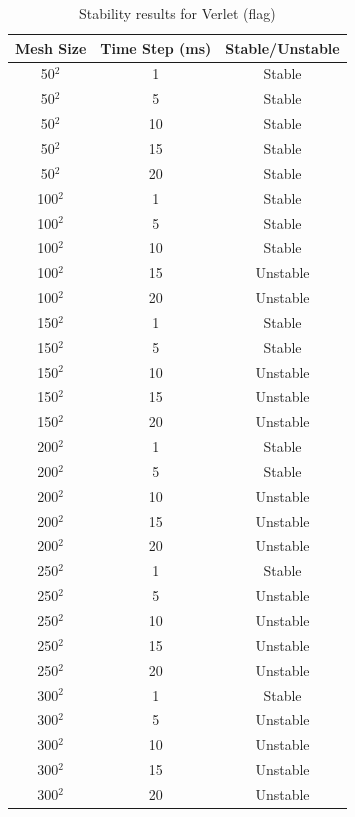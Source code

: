 \begin{table}[tp]
   \begin{minipage}{\textwidth}
      \begin{center}
         \begin{tabular}{|c|c|c|} \hline
           Mesh Size & Time Step (ms) & Stable/Unstable\\
           \hline
           50$^{2}$ & 1 & Stable\\ \hline
           50$^{2}$ & 5 & Stable\\ \hline
           50$^{2}$ & 10 & Stable\\ \hline
           50$^{2}$ & 15 & Stable\\ \hline
           50$^{2}$ & 20 & Stable\\ \hline
           100$^{2}$ & 1 & Stable\\ \hline
           100$^{2}$ & 5 & Stable\\ \hline
           100$^{2}$ & 10 & Stable\\ \hline
           100$^{2}$ & 15 & Unstable\\ \hline
           100$^{2}$ & 20 & Unstable\\ \hline           
           150$^{2}$ & 1 & Stable\\ \hline
           150$^{2}$ & 5 & Stable\\ \hline
           150$^{2}$ & 10 & Unstable\\ \hline
           150$^{2}$ & 15 & Unstable\\ \hline
           150$^{2}$ & 20 & Unstable\\ \hline           
           200$^{2}$ & 1 & Stable\\ \hline
           200$^{2}$ & 5 & Stable\\ \hline
           200$^{2}$ & 10 & Unstable\\ \hline
           200$^{2}$ & 15 & Unstable\\ \hline
           200$^{2}$ & 20 & Unstable\\ \hline           
           250$^{2}$ & 1 & Stable\\ \hline
           250$^{2}$ & 5 & Unstable\\ \hline
           250$^{2}$ & 10 & Unstable\\ \hline
           250$^{2}$ & 15 & Unstable\\ \hline
           250$^{2}$ & 20 & Unstable\\ \hline           
           300$^{2}$ & 1 & Stable\\ \hline
           300$^{2}$ & 5 & Unstable\\ \hline
           300$^{2}$ & 10 & Unstable\\ \hline
           300$^{2}$ & 15 & Unstable\\ \hline
           300$^{2}$ & 20 & Unstable\\ \hline
         \end{tabular}
      \end{center}
   \end{minipage}
   \caption{Stability results for Verlet (flag)}
   \label{tab:v stability flag}
\end{table}

